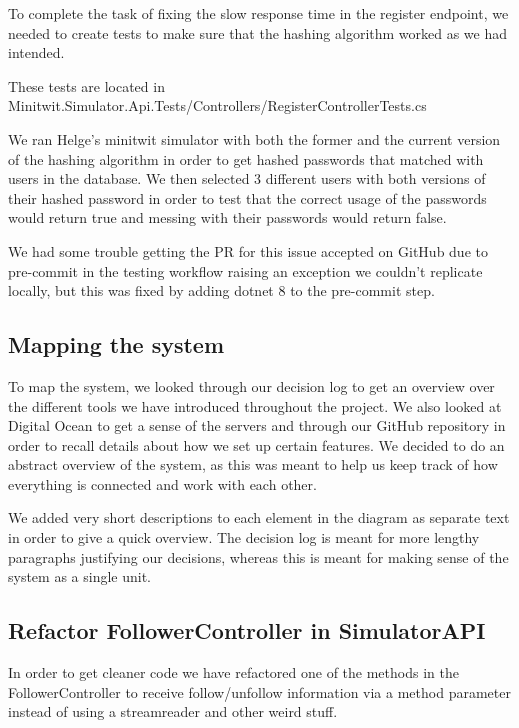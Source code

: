 To complete the task of fixing the slow response time in the register endpoint, we needed to create tests to make sure that the hashing algorithm worked as we had intended.

These tests are located in Minitwit.Simulator.Api.Tests/Controllers/RegisterControllerTests.cs

We ran Helge's minitwit simulator with both the former and the current version of the hashing algorithm in order to get hashed passwords that matched with users in the database. We then selected 3 different users with both versions of their hashed password in order to test that the correct usage of the passwords would return true and messing with their passwords would return false.

We had some trouble getting the PR for this issue accepted on GitHub due to pre-commit in the testing workflow raising an exception we couldn't replicate locally, but this was fixed by adding dotnet 8 to the pre-commit step.

\subsection{Mapping the system}
\label{log:mapping-the-system}

To map the system, we looked through our decision log to get an overview over the different tools we have introduced throughout the project. We also looked at Digital Ocean to get a sense of the servers and through our GitHub repository in order to recall details about how we set up certain features. We decided to do an abstract overview of the system, as this was meant to help us keep track of how everything is connected and work with each other.

We added very short descriptions to each element in the diagram as separate text in order to give a quick overview. The decision log is meant for more lengthy paragraphs justifying our decisions, whereas this is meant for making sense of the system as a single unit.

\subsection{Refactor FollowerController in SimulatorAPI}
\label{log:refactor-followercontroller-in-simulatorapi}

In order to get cleaner code we have refactored one of the methods in the FollowerController to receive follow/unfollow information via a method parameter instead of using a streamreader and other weird stuff.


